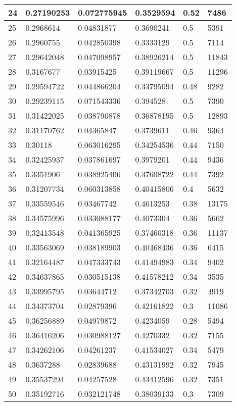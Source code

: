 \begin{longtable}{|l|l|l|l|l|l|}
24 & 0.27190253 & 0.072775945 & 0.3529594 & 0.52 & 7486 \\ \hline 
25 & 0.2968614 & 0.04831877 & 0.3690241 & 0.5 & 5391 \\ \hline 
26 & 0.2960755 & 0.042850398 & 0.3333129 & 0.5 & 7114 \\ \hline 
27 & 0.29642048 & 0.047098957 & 0.38926214 & 0.5 & 11843 \\ \hline 
28 & 0.3167677 & 0.03915425 & 0.39119667 & 0.5 & 11296 \\ \hline 
29 & 0.29594722 & 0.044866204 & 0.33795094 & 0.48 & 9282 \\ \hline 
30 & 0.29239115 & 0.071543336 & 0.394528 & 0.5 & 7390 \\ \hline 
31 & 0.31422025 & 0.038790878 & 0.36878195 & 0.5 & 12893 \\ \hline 
32 & 0.31170762 & 0.04365847 & 0.3739611 & 0.46 & 9364 \\ \hline 
33 & 0.30118 & 0.063016295 & 0.34254536 & 0.44 & 7150 \\ \hline 
34 & 0.32425937 & 0.037861697 & 0.3979201 & 0.44 & 9436 \\ \hline 
35 & 0.3351906 & 0.038925406 & 0.37608722 & 0.44 & 7392 \\ \hline 
36 & 0.31207734 & 0.060313858 & 0.40415806 & 0.4 & 5632 \\ \hline 
37 & 0.33559546 & 0.03467742 & 0.4613253 & 0.38 & 13175 \\ \hline 
38 & 0.34575996 & 0.033088177 & 0.4073304 & 0.36 & 5662 \\ \hline 
39 & 0.32413548 & 0.041365925 & 0.37460318 & 0.36 & 11137 \\ \hline 
40 & 0.33563069 & 0.038189903 & 0.40468436 & 0.36 & 6415 \\ \hline 
41 & 0.32164487 & 0.047333743 & 0.41494983 & 0.34 & 9402 \\ \hline 
42 & 0.34637865 & 0.030515138 & 0.41578212 & 0.34 & 3535 \\ \hline 
43 & 0.33995795 & 0.03644712 & 0.37342703 & 0.32 & 4919 \\ \hline 
44 & 0.34373704 & 0.02879396 & 0.42161822 & 0.3 & 11086 \\ \hline 
45 & 0.36256889 & 0.04979872 & 0.4234059 & 0.28 & 5494 \\ \hline 
46 & 0.36416206 & 0.030988127 & 0.4270332 & 0.32 & 7155 \\ \hline 
47 & 0.34262106 & 0.04261237 & 0.41534027 & 0.34 & 5479 \\ \hline 
48 & 0.3637288 & 0.02839688 & 0.43131992 & 0.32 & 7945 \\ \hline 
49 & 0.35537294 & 0.04257528 & 0.43412596 & 0.32 & 7351 \\ \hline 
50 & 0.35192716 & 0.032121748 & 0.38039133 & 0.3 & 7309 \\ \hline 
\end{longtable}